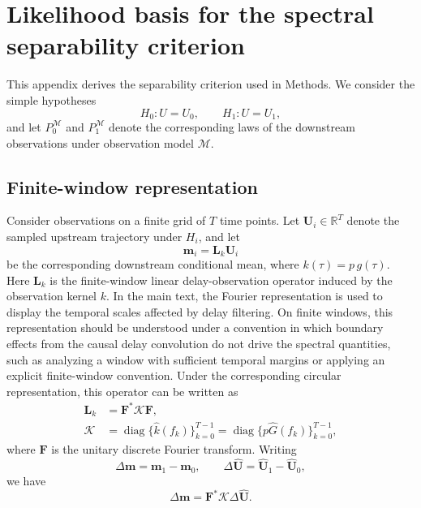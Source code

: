 \renewcommand{\thesection}{S\arabic{section}}
\setcounter{section}{0}
\section{Likelihood basis for the spectral separability criterion}
\label{sec:Appendix_S1}

This appendix derives the separability criterion used in Methods. We consider the simple hypotheses
\[
H_0:U=U_0,
\qquad
H_1:U=U_1,
\]
and let \(P_0^{\mathcal M}\) and \(P_1^{\mathcal M}\) denote the corresponding laws of the downstream observations under observation model \(\mathcal M\).

\subsection{Finite-window representation}

Consider observations on a finite grid of \(T\) time points. Let \(\mathbf U_i\in\mathbb R^T\) denote the sampled upstream trajectory under \(H_i\), and let
\[
\mathbf m_i=\mathbf L_k\mathbf U_i
\]
be the corresponding downstream conditional mean, where \(k(\tau)=p\,g(\tau)\). Here \(\mathbf L_k\) is the finite-window linear delay-observation operator induced by the observation kernel \(k\). In the main text, the Fourier representation is used to display the temporal scales affected by delay filtering. On finite windows, this representation should be understood under a convention in which boundary effects from the causal delay convolution do not drive the spectral quantities, such as analyzing a window with sufficient temporal margins or applying an explicit finite-window convention. Under the corresponding circular representation, this operator can be written as
\[
\begin{aligned}
\mathbf L_k
&=
\mathbf F^*\mathcal K\mathbf F,\\
\mathcal K
&=
\operatorname{diag}\{\widehat k(f_k)\}_{k=0}^{T-1}
=
\operatorname{diag}\{p\widehat G(f_k)\}_{k=0}^{T-1},
\end{aligned}
\]
where \(\mathbf F\) is the unitary discrete Fourier transform. Writing
\[
\Delta\mathbf m=\mathbf m_1-\mathbf m_0,
\qquad
\Delta\widehat{\mathbf U}
=
\widehat{\mathbf U}_1-\widehat{\mathbf U}_0,
\]
we have
\begin{equation}
\Delta\mathbf m
=
\mathbf F^*
\mathcal K
\Delta\widehat{\mathbf U}.
\label{eq:S1-mean-difference}
\end{equation}

